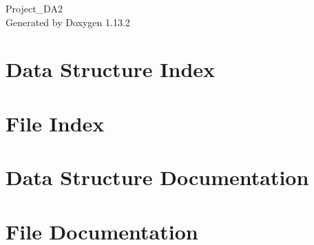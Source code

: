 \documentclass[twoside]{book}
\newcommand{\+}{\discretionary{\mbox{\scriptsize$\hookleftarrow$}}{}{}}
\newcommand{\clearemptydoublepage}{%
    \newpage{\pagestyle{empty}\cleardoublepage}%
  }
\begin{document}
  \raggedbottom
    \hypersetup{pageanchor=false,
                bookmarksnumbered=true,
                pdfencoding=unicode
               }
  \begin{titlepage}
  \vspace*{7cm}
  \begin{center}%
  {\Large Project\+\_\+\+DA2}\\
  \vspace*{1cm}
  {\large Generated by Doxygen 1.13.2}\\
  \end{center}
  \end{titlepage}
  \clearemptydoublepage
  \tableofcontents
  \clearemptydoublepage
  \hypersetup{pageanchor=true}
\chapter{Data Structure Index}

\chapter{File Index}

\chapter{Data Structure Documentation}



\chapter{File Documentation}










  \backmatter
  \newpage
  \clearemptydoublepage
  \printindex
\end{document}
